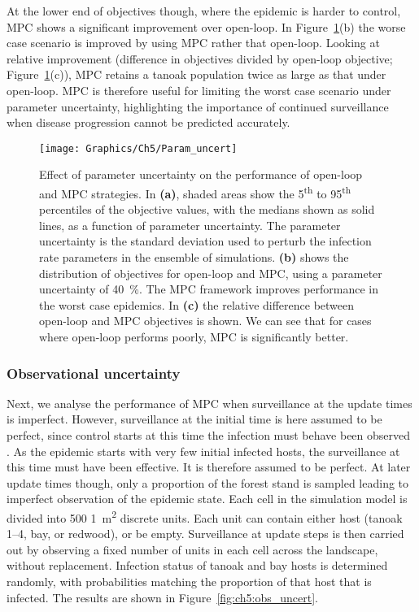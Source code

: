 At the lower end of objectives though, where the epidemic is harder to control, MPC shows a significant improvement over open-loop. In Figure~\ref{fig:ch5:param_uncert}(b) the worse case scenario is improved by using MPC rather that open-loop. Looking at relative improvement (difference in objectives divided by open-loop objective; Figure~\ref{fig:ch5:param_uncert}(c)), MPC retains a tanoak population twice as large as that under open-loop. MPC is therefore useful for limiting the worst case scenario under parameter uncertainty, highlighting the importance of continued surveillance when disease progression cannot be predicted accurately.

\begin{figure}[h]
    \begin{center}
        \texttt{[image: Graphics/Ch5/Param\_uncert]}
        \caption[Performance of OL and MPC under parameter uncertainty]{Effect of parameter uncertainty on the performance of open-loop and MPC strategies. In \textbf{(a)}, shaded areas show the 5\textsuperscript{th} to 95\textsuperscript{th} percentiles of the objective values, with the medians shown as solid lines, as a function of parameter uncertainty. The parameter uncertainty is the standard deviation used to perturb the infection rate parameters in the ensemble of simulations. \textbf{(b)} shows the distribution of objectives for open-loop and MPC, using a parameter uncertainty of \SI{40}{\percent}. The MPC framework improves performance in the worst case epidemics. In \textbf{(c)} the relative difference between open-loop and MPC objectives is shown. We can see that for cases where open-loop performs poorly, MPC is significantly better.\label{fig:ch5:param_uncert}}
    \end{center}
\end{figure}
\FloatBarrier
\subsubsection{Observational uncertainty}

Next, we analyse the performance of MPC when surveillance at the update times is imperfect. However, surveillance at the initial time is here assumed to be perfect, since control starts at this time the infection must behave been observed . As the epidemic starts with very few initial infected hosts, the surveillance at this time must have been effective. It is therefore assumed to be perfect. At later update times though, only a proportion of the forest stand is sampled leading to imperfect observation of the epidemic state. Each cell in the simulation model is divided into 500 \SI{1}{\meter\squared} discrete units. Each unit can contain either host (tanoak 1--4, bay, or redwood), or be empty. Surveillance at update steps is then carried out by observing a fixed number of units in each cell across the landscape, without replacement. Infection status of tanoak and bay hosts is determined randomly, with probabilities matching the proportion of that host that is infected. The results are shown in Figure~\ref{fig:ch5:obs_uncert}.

